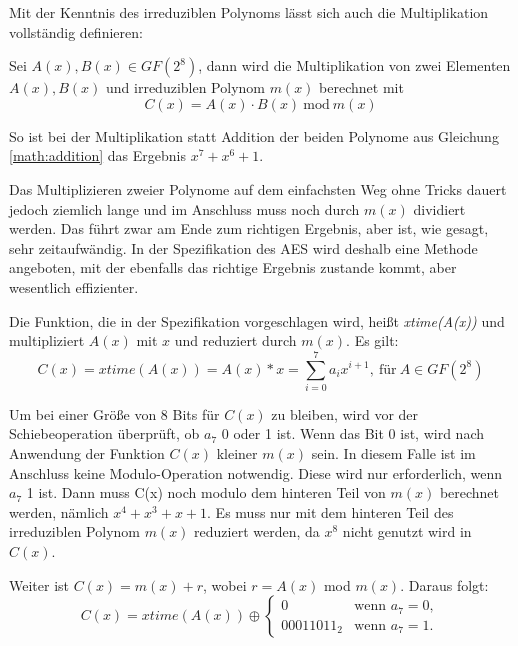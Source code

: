  Mit der Kenntnis des irreduziblen Polynoms lässt sich auch die Multiplikation vollständig definieren:
 
 \begin{center}
  \parbox{13cm}{\centering
   Sei $A(x), B(x) \in GF(2^8)$, dann wird die Multiplikation von zwei Elementen $A(x), B(x)$
   und irreduziblen Polynom $m(x)$ berechnet mit
   \begin{equation*}
    C(x) = A(x) \cdot B(x) ~\text{mod}~ m(x)
   \end{equation*}
  }
 \end{center} 
 
 So ist bei der Multiplikation statt Addition der beiden Polynome aus Gleichung \ref{math:addition} das
 Ergebnis $x^7 + x^6 +1$.
 
 Das Multiplizieren zweier Polynome auf dem einfachsten Weg ohne Tricks dauert jedoch ziemlich lange
 und im Anschluss muss noch durch $m(x)$ dividiert werden. Das führt zwar am Ende zum richtigen Ergebnis,
 aber ist, wie gesagt, sehr zeitaufwändig. In der Spezifikation des AES wird deshalb eine Methode angeboten,
 mit der ebenfalls das richtige Ergebnis zustande kommt, aber wesentlich effizienter.
 
 Die Funktion, die in der Spezifikation vorgeschlagen wird, heißt \emph{xtime(A(x))} und multipliziert
 $A(x)$ mit $x$ und reduziert durch $m(x)$. Es gilt:
 \begin{equation*}
    C(x) = xtime(A(x)) = A(x) * x = \sum_{i=0}^7 a_ix^{i+1}, ~ \text{für}~ A \in GF(2^8)
 \end{equation*}
 
 Um bei einer Größe von 8 Bits für $C(x)$ zu bleiben, wird vor der Schiebeoperation überprüft, ob
 $a_7$ 0 oder 1 ist. Wenn das Bit 0 ist, wird nach Anwendung der Funktion $C(x)$ kleiner $m(x)$ sein. In
 diesem Falle ist im Anschluss keine Modulo-Operation notwendig. Diese wird nur erforderlich, wenn $a_7$ 1 ist. Dann
 muss C(x) noch modulo dem hinteren Teil von $m(x)$ berechnet werden, nämlich $x^4 + x^3 + x +1$. Es
 muss nur mit dem hinteren Teil des irreduziblen Polynom $m(x)$ reduziert werden, da $x^8$ nicht genutzt
 wird in $C(x)$. \cite{AES-FIPS}
 
 Weiter ist $C(x) = m(x) + r$, wobei $r = A(x)$ mod $m(x)$. Daraus folgt:
 \begin{equation*}
    C(x) = xtime(A(x)) \oplus \begin{cases}
      0	 		& \text{wenn $a_7 = 0$},\\
      00011011_2 	& \text{wenn $a_7 = 1$}.
     \end{cases}
 \end{equation*}
 
